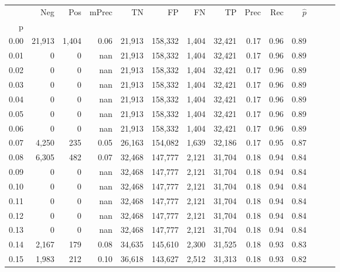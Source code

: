 \begin{tabular}{rrrrrrrrrrrrrr}
\toprule
{} &     Neg &    Pos & mPrec &       TN &       FP &      FN &      TP &  Prec &   Rec & $\hat{p}$ \\
p    &         &        &       &          &          &         &         &       &       &           \\
\midrule
0.00 &  21,913 &  1,404 &  0.06 &   21,913 &  158,332 &   1,404 &  32,421 &  0.17 &  0.96 &      0.89 \\
0.01 &       0 &      0 &   nan &   21,913 &  158,332 &   1,404 &  32,421 &  0.17 &  0.96 &      0.89 \\
0.02 &       0 &      0 &   nan &   21,913 &  158,332 &   1,404 &  32,421 &  0.17 &  0.96 &      0.89 \\
0.03 &       0 &      0 &   nan &   21,913 &  158,332 &   1,404 &  32,421 &  0.17 &  0.96 &      0.89 \\
0.04 &       0 &      0 &   nan &   21,913 &  158,332 &   1,404 &  32,421 &  0.17 &  0.96 &      0.89 \\
0.05 &       0 &      0 &   nan &   21,913 &  158,332 &   1,404 &  32,421 &  0.17 &  0.96 &      0.89 \\
0.06 &       0 &      0 &   nan &   21,913 &  158,332 &   1,404 &  32,421 &  0.17 &  0.96 &      0.89 \\
0.07 &   4,250 &    235 &  0.05 &   26,163 &  154,082 &   1,639 &  32,186 &  0.17 &  0.95 &      0.87 \\
0.08 &   6,305 &    482 &  0.07 &   32,468 &  147,777 &   2,121 &  31,704 &  0.18 &  0.94 &      0.84 \\
0.09 &       0 &      0 &   nan &   32,468 &  147,777 &   2,121 &  31,704 &  0.18 &  0.94 &      0.84 \\
0.10 &       0 &      0 &   nan &   32,468 &  147,777 &   2,121 &  31,704 &  0.18 &  0.94 &      0.84 \\
0.11 &       0 &      0 &   nan &   32,468 &  147,777 &   2,121 &  31,704 &  0.18 &  0.94 &      0.84 \\
0.12 &       0 &      0 &   nan &   32,468 &  147,777 &   2,121 &  31,704 &  0.18 &  0.94 &      0.84 \\
0.13 &       0 &      0 &   nan &   32,468 &  147,777 &   2,121 &  31,704 &  0.18 &  0.94 &      0.84 \\
0.14 &   2,167 &    179 &  0.08 &   34,635 &  145,610 &   2,300 &  31,525 &  0.18 &  0.93 &      0.83 \\
0.15 &   1,983 &    212 &  0.10 &   36,618 &  143,627 &   2,512 &  31,313 &  0.18 &  0.93 &      0.82 \\

\end{tabular}
